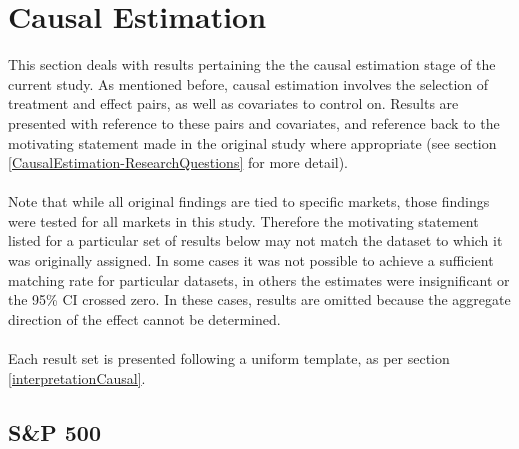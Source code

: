 \section{Causal Estimation}\label{S.causal4}
{This section deals with results pertaining the the causal estimation stage of the current study. As mentioned before, causal estimation involves the selection of treatment and effect pairs, as well as covariates to control on. Results are presented with reference to these pairs and covariates, and reference back to the motivating statement made in the original study where appropriate (see section \ref{CausalEstimation-ResearchQuestions} for more detail). \\\\
Note that while all original findings are tied to specific markets, those findings were tested for all markets in this study. Therefore the motivating statement listed for a particular set of results below may not match the dataset to which it was originally assigned. In some cases it was not possible to achieve a sufficient matching rate for particular datasets, in others the estimates were insignificant or the 95\% CI crossed zero. In these cases, results are omitted because the aggregate direction of the effect cannot be determined.\\\\
Each result set is presented following a uniform template, as per section \ref{interpretationCausal}. 
\clearpage
\subsection{S\&P 500}
}

